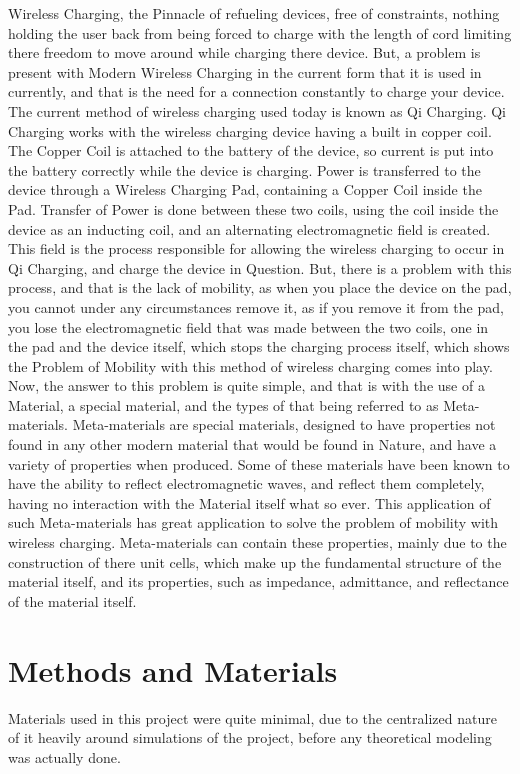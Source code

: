 \documentclass[]{article}
\begin{document}
Wireless Charging, the Pinnacle of refueling devices, free of constraints, nothing holding the user back from being forced to charge with the length of cord limiting there freedom to move around while charging there device. But, a problem is present with Modern Wireless Charging in the current form that it is used in currently, and that is the need for a connection constantly to charge your device. The current method of wireless charging used today is known as Qi Charging. Qi Charging works with the wireless charging device having a built in copper coil. The Copper Coil is attached to the battery of the device, so current is put into the battery correctly while the device is charging. Power is transferred to the device through a Wireless Charging Pad, containing a Copper Coil inside the Pad. Transfer of Power is done between these two coils, using the coil inside the device as an inducting coil, and an alternating electromagnetic field is created. This field is the process responsible for allowing the wireless charging to occur in Qi Charging, and charge the device in Question. But, there is a problem with this process, and that is the lack of mobility, as when you place the device on the pad, you cannot under any circumstances remove it, as if you remove it from the pad, you lose the electromagnetic field that was made between the two coils, one in the pad and the device itself, which stops the charging process itself, which shows the Problem of Mobility with this method of wireless charging comes into play. Now, the answer to this problem is quite simple, and that is with the use of a Material, a special material, and the types of that being referred to as Meta-materials. Meta-materials are special materials, designed to have properties not found in any other modern material that would be found in Nature, and have a variety of properties when produced. Some of these materials have been known to have the ability to reflect electromagnetic waves, and reflect them completely, having no interaction with the Material itself what so ever. This application of such Meta-materials has great application to solve the problem of mobility with wireless charging. Meta-materials can contain these properties, mainly due to the construction of there unit cells, which make up the fundamental structure of the material itself, and its properties, such as impedance, admittance, and reflectance of the material itself.

\section{Methods and Materials} 
Materials used in this project were quite minimal, due to the centralized nature of it heavily around simulations of the project, before any theoretical modeling was actually done.
\end{document}

